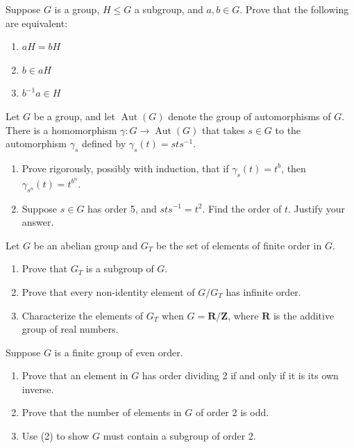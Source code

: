 \documentclass[11pt,twoside,openany]{memoir}
\begin{document}
        \begin{exercise}
        Suppose $G$ is a group, $H\le G$ a subgroup, and $a,b\in G$. Prove that the following are equivalent:
        \begin{enumerate}[label = (\arabic*)]
            \item $aH=bH$
            \item $b\in aH$
            \item $b^{-1}a\in H$
        \end{enumerate}
        \end{exercise}
        
        \newpage
        \begin{exercise}
        Let $G$ be a group, and let $\operatorname{Aut}(G)$ denote the group of automorphisms of $G$. There is a homomorphism $\gamma:G\to \operatorname{Aut}(G)$ that takes $s\in G$ to the automorphism $\gamma_s$ defined by $\gamma_s(t)=sts^{-1}$.
        \begin{enumerate}[label = (\arabic*)]
            \item Prove rigorously, possibly with induction, that if $\gamma_s(t)=t^b$, then $\gamma_{s^n}(t)=t^{b^n}$.
            \item Suppose $s\in G$ has order 5, and $sts^{-1}=t^2$. Find the order of $t$. Justify your answer.
        \end{enumerate}
        \end{exercise}
        
        \begin{exercise}
        Let $G$ be an abelian group and $G_T$ be the set of elements of finite order in $G$.
        \begin{enumerate}[label = (\arabic*)]
            \item Prove that $G_T$ is a subgroup of $G$.
            \item Prove that every non-identity element of $G/G_T$ has infinite order.
            \item Characterize the elements of $G_T$ when $G=\mathbf{R}/\mathbf{Z}$, where $\mathbf{R}$ is the additive group of real numbers.
        \end{enumerate}
        \end{exercise}
        
        \begin{exercise}
        Suppose $G$ is a finite group of even order.
        \begin{enumerate}[label = (\arabic*)]
            \item Prove that an element in $G$ has order dividing 2 if and only if it is its own inverse.
            \item Prove that the number of elements in $G$ of order 2 is odd.
            \item Use (2) to show $G$ must contain a subgroup of order 2.
        \end{enumerate}
        \end{exercise}
        
\end{document}
